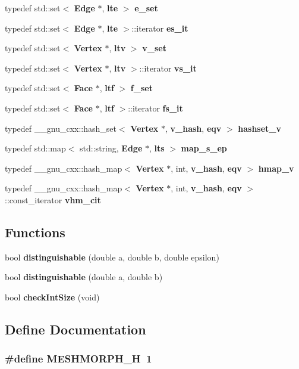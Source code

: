 \begin{CompactItemize}
typedef std::set$<$ {\bf Edge} $\ast$, {\bf lte} $>$ {\bf e\_\-set}
\item 
typedef std::set$<$ {\bf Edge} $\ast$, {\bf lte} $>$::iterator {\bf es\_\-it}
\item 
typedef std::set$<$ {\bf Vertex} $\ast$, {\bf ltv} $>$ {\bf v\_\-set}
\item 
typedef std::set$<$ {\bf Vertex} $\ast$, {\bf ltv} $>$::iterator {\bf vs\_\-it}
\item 
typedef std::set$<$ {\bf Face} $\ast$, {\bf ltf} $>$ {\bf f\_\-set}
\item 
typedef std::set$<$ {\bf Face} $\ast$, {\bf ltf} $>$::iterator {\bf fs\_\-it}
\item 
typedef \_\-\_\-gnu\_\-cxx::hash\_\-set$<$ {\bf Vertex} $\ast$, {\bf v\_\-hash}, {\bf eqv} $>$ {\bf hashset\_\-v}
\item 
typedef std::map$<$ std::string, {\bf Edge} $\ast$, {\bf lts} $>$ {\bf map\_\-s\_\-ep}
\item 
typedef \_\-\_\-gnu\_\-cxx::hash\_\-map$<$ {\bf Vertex} $\ast$, int, {\bf v\_\-hash}, {\bf eqv} $>$ {\bf hmap\_\-v}
\item 
typedef \_\-\_\-gnu\_\-cxx::hash\_\-map$<$ {\bf Vertex} $\ast$, int, {\bf v\_\-hash}, {\bf eqv} $>$::const\_\-iterator {\bf vhm\_\-cit}
\end{CompactItemize}
\subsection*{Functions}
\begin{CompactItemize}
\item 
bool {\bf distinguishable} (double a, double b, double epsilon)
\item 
bool {\bf distinguishable} (double a, double b)
\item 
bool {\bf check\-Int\-Size} (void)
\end{CompactItemize}


\subsection{Define Documentation}
\subsubsection{\setlength{\rightskip}{0pt plus 5cm}\#define MESHMORPH\_\-H~1}\label{meshmorph_8h_71120f21a107c5b75048614176bf8599}




